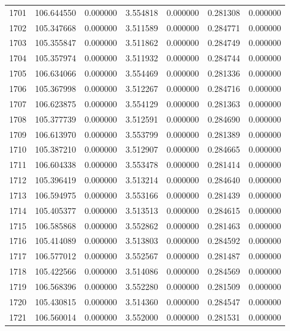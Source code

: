 \begin{tabular}{rrrrrrr}
1701 & 106.644550 &    0.000000 &  3.554818 &   0.000000 &   0.281308 &  0.000000 \\
1702 & 105.347668 &    0.000000 &  3.511589 &   0.000000 &   0.284771 &  0.000000 \\
1703 & 105.355847 &    0.000000 &  3.511862 &   0.000000 &   0.284749 &  0.000000 \\
1704 & 105.357974 &    0.000000 &  3.511932 &   0.000000 &   0.284744 &  0.000000 \\
1705 & 106.634066 &    0.000000 &  3.554469 &   0.000000 &   0.281336 &  0.000000 \\
1706 & 105.367998 &    0.000000 &  3.512267 &   0.000000 &   0.284716 &  0.000000 \\
1707 & 106.623875 &    0.000000 &  3.554129 &   0.000000 &   0.281363 &  0.000000 \\
1708 & 105.377739 &    0.000000 &  3.512591 &   0.000000 &   0.284690 &  0.000000 \\
1709 & 106.613970 &    0.000000 &  3.553799 &   0.000000 &   0.281389 &  0.000000 \\
1710 & 105.387210 &    0.000000 &  3.512907 &   0.000000 &   0.284665 &  0.000000 \\
1711 & 106.604338 &    0.000000 &  3.553478 &   0.000000 &   0.281414 &  0.000000 \\
1712 & 105.396419 &    0.000000 &  3.513214 &   0.000000 &   0.284640 &  0.000000 \\
1713 & 106.594975 &    0.000000 &  3.553166 &   0.000000 &   0.281439 &  0.000000 \\
1714 & 105.405377 &    0.000000 &  3.513513 &   0.000000 &   0.284615 &  0.000000 \\
1715 & 106.585868 &    0.000000 &  3.552862 &   0.000000 &   0.281463 &  0.000000 \\
1716 & 105.414089 &    0.000000 &  3.513803 &   0.000000 &   0.284592 &  0.000000 \\
1717 & 106.577012 &    0.000000 &  3.552567 &   0.000000 &   0.281487 &  0.000000 \\
1718 & 105.422566 &    0.000000 &  3.514086 &   0.000000 &   0.284569 &  0.000000 \\
1719 & 106.568396 &    0.000000 &  3.552280 &   0.000000 &   0.281509 &  0.000000 \\
1720 & 105.430815 &    0.000000 &  3.514360 &   0.000000 &   0.284547 &  0.000000 \\
1721 & 106.560014 &    0.000000 &  3.552000 &   0.000000 &   0.281531 &  0.000000 \\

\end{tabular}
